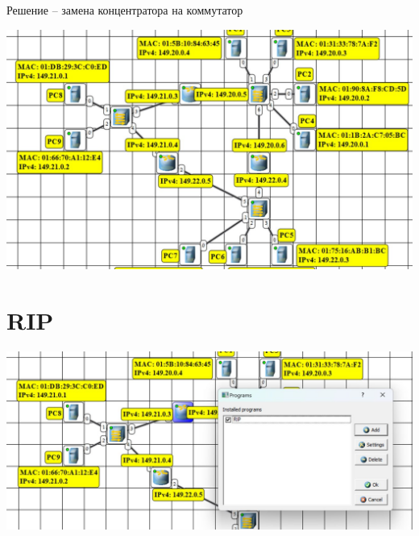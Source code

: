 \documentclass{article}
\begin{document}
Решение -- замена концентратора на коммутатор
\begin{center}
    \includegraphics[width=.9\textwidth]{3-6}
\end{center}
\section*{RIP}
\begin{center}
    \includegraphics[width=.9\textwidth]{3-7}
\end{center}
\end{document}
